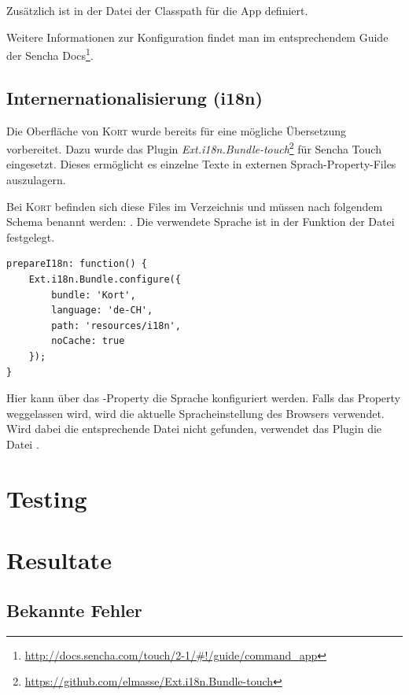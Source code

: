 Zusätzlich ist in der Datei  der Classpath für die App definiert.

Weitere Informationen zur Konfiguration findet man im entsprechendem Guide der Sencha Docs\footnote{\url{http://docs.sencha.com/touch/2-1/\#!/guide/command\_app}}.

\subsection{Internernationalisierung (i18n)}
\label{i18n}
Die Oberfläche von \textsc{Kort} wurde bereits für eine mögliche Übersetzung vorbereitet.
Dazu wurde das Plugin \emph{Ext.i18n.Bundle-touch}\footnote{\url{https://github.com/elmasse/Ext.i18n.Bundle-touch}} für Sencha Touch eingesetzt. Dieses ermöglicht es einzelne Texte in externen Sprach-Property-Files auszulagern.

Bei \textsc{Kort} befinden sich diese Files im Verzeichnis  und müssen nach folgendem Schema benannt werden: .
Die verwendete Sprache ist in der Funktion  der Datei  festgelegt.

\lstset{language=JavaScript}
\begin{lstlisting}[caption=kort - Sprache definieren, label=kort-choose-language]
prepareI18n: function() {
	Ext.i18n.Bundle.configure({
		bundle: 'Kort',
		language: 'de-CH',
		path: 'resources/i18n',
		noCache: true
	});
}
\end{lstlisting}

Hier kann über das -Property die Sprache konfiguriert werden.
Falls das Property weggelassen wird, wird die aktuelle Spracheinstellung des Browsers verwendet.
Wird dabei die entsprechende Datei nicht gefunden, verwendet das Plugin die Datei .

\section{Testing}

\section{Resultate}

\subsection{Bekannte Fehler}

